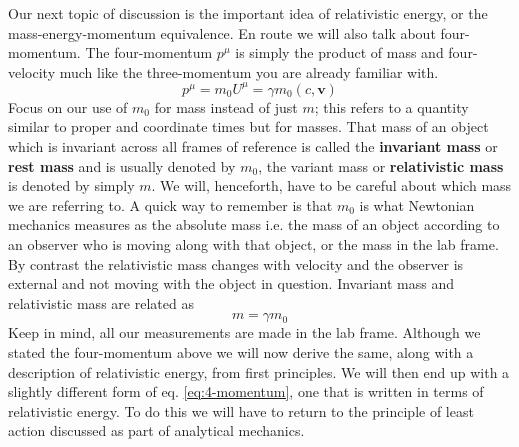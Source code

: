 \documentclass[english,seminar]{lecture}
\begin{document}
Our next topic of discussion is the important idea of relativistic energy, or the mass-energy-momentum equivalence. En route we will also talk about four-momentum. The four-momentum $p^\mu$ is simply the product of mass and four-velocity much like the three-momentum you are already familiar with.
\begin{equation}
	p^\mu = m_0U^\mu = \gamma m_0 (c, \mathbf{v}) \label{eq:4-momentum}
\end{equation}%
Focus on our use of $m_0$ for mass instead of just $m$; this refers to a quantity similar to proper and coordinate times but for masses. That mass of an object which is invariant across all frames of reference is called the \textbf{invariant mass} or \textbf{rest mass} and is usually denoted by $m_0$, the variant mass or \textbf{relativistic mass} is denoted by simply $m$. We will, henceforth, have to be careful about which mass we are referring to. A quick way to remember is that $m_0$ is what Newtonian mechanics measures as the absolute mass i.e. the mass of an object according to an observer who is moving along with that object, or the mass in the lab frame. By contrast the relativistic mass changes with velocity and the observer is external and not moving with the object in question. Invariant mass and relativistic mass are related as
\begin{equation}
	m = \gamma m_0 \label{eq:relativisticMass}
\end{equation}%
Keep in mind, all our measurements are made in the lab frame. Although we stated the four-momentum above we will now derive the same, along with a description of relativistic energy, from first principles. We will then end up with a slightly different form of eq. \eqref{eq:4-momentum}, one that is written in terms of relativistic energy. To do this we will have to return to the principle of least action discussed as part of analytical mechanics.
 
\end{document}
